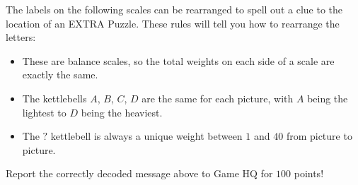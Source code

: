 
\begin{puzzle}
  The labels on the following scales can be rearranged to spell out a clue
  to the location of an EXTRA Puzzle. These rules will tell you how to
  rearrange the letters:

  \begin{itemize}
  \item These are balance scales, so the total weights on each side of a scale
        are exactly the same.
  \item The kettlebells $A$, $B$, $C$, $D$ are the same for each picture,
        with $A$ being the lightest to $D$ being the heaviest.
  \item The $?$ kettlebell is always a unique weight between $1$ and $40$ from
        picture to picture.
  \end{itemize}

  \vfill

  \begin{center}
    \hspace{2em}
    \hspace{2em}

    \hspace{2em}

    \hspace{2em}

    \hspace{2em}
  \end{center}

  Report the correctly decoded message above to Game HQ for \(100\) points!

  \vfill

  \newpage


\end{puzzle}
